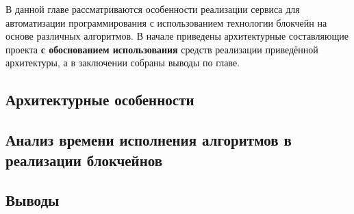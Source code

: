 В данной главе рассматриваются особенности реализации сервиса для
автоматизации программирования с использованием технологии блокчейн на основе
различных алгоритмов. В начале приведены архитектурные составляющие проекта
\textbf{с обоснованием использования} средств реализации приведённой
архитектуры, а в заключении собраны выводы по главе.

\subsection{Архитектурные особенности}


\subsection{Анализ времени исполнения алгоритмов в реализации блокчейнов}


\newpage
\subsection{Выводы}

